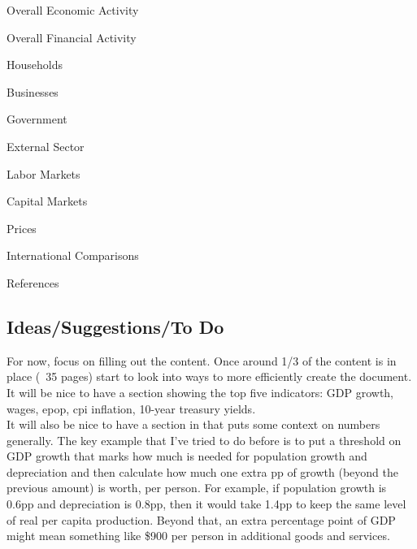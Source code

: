 \documentclass{report}
\begin{document}
\begin{description}

\item {\seriffont Overall Economic Activity}

\item {\seriffont Overall Financial Activity}

\item {\seriffont Households}

\item {\seriffont Businesses}

\item {\seriffont Government}

\item {\seriffont External Sector}

\item {\seriffont Labor Markets}

\item {\seriffont Capital Markets}

\item {\seriffont Prices}

\item {\seriffont International Comparisons}

\item {\seriffont References}

\end{description}

\vspace{6mm}


\subsection*{\color{black!70} {\seriffont Ideas/Suggestions/To Do}}

\begin{minipage}{0.76\textwidth}

\small For now, focus on filling out the content. Once around 1/3 of the content is in place (~35 pages) start to look into ways to more efficiently create the document. \\

It will be nice to have a section showing the top five indicators: GDP growth, wages, epop, cpi inflation, 10-year treasury yields. \\

It will also be nice to have a section in that puts some context on numbers generally. The key example that I've tried to do before is to put a threshold on GDP growth that marks how much is needed for population growth and depreciation and then calculate how much one extra pp of growth (beyond the previous amount) is worth, per person. For example, if population growth is 0.6pp and depreciation is 0.8pp, then it would take 1.4pp to keep the same level of real per capita production. Beyond that, an extra percentage point of GDP might mean something like \$900 per person in additional goods and services. \\

\end{minipage}
\end{document}
